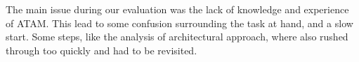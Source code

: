 The main issue during our evaluation was the lack of knowledge and experience of ATAM. This lead to some confusion surrounding the task at hand, and a slow start. Some steps, like the analysis of architectural approach, where also rushed through too quickly and had to be revisited.
